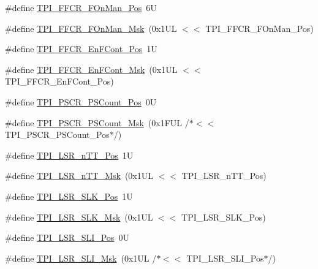 \begin{DoxyCompactItemize}
\item 
\#define \mbox{\hyperlink{group___c_m_s_i_s___t_p_i_gac57b0b588a37a870573560bc6316cbcc}{T\+P\+I\+\_\+\+F\+F\+C\+R\+\_\+\+F\+On\+Man\+\_\+\+Pos}}~6U
\item 
\#define \mbox{\hyperlink{group___c_m_s_i_s___t_p_i_ga7aeb30af62d04e852a55c3bd64c1bd2c}{T\+P\+I\+\_\+\+F\+F\+C\+R\+\_\+\+F\+On\+Man\+\_\+\+Msk}}~(0x1\+U\+L $<$$<$ T\+P\+I\+\_\+\+F\+F\+C\+R\+\_\+\+F\+On\+Man\+\_\+\+Pos)
\item 
\#define \mbox{\hyperlink{group___c_m_s_i_s___t_p_i_ga99e58a0960b275a773b245e2b69b9a64}{T\+P\+I\+\_\+\+F\+F\+C\+R\+\_\+\+En\+F\+Cont\+\_\+\+Pos}}~1U
\item 
\#define \mbox{\hyperlink{group___c_m_s_i_s___t_p_i_ga27d1ecf2e0ff496df03457a2a97cb2c9}{T\+P\+I\+\_\+\+F\+F\+C\+R\+\_\+\+En\+F\+Cont\+\_\+\+Msk}}~(0x1\+U\+L $<$$<$ T\+P\+I\+\_\+\+F\+F\+C\+R\+\_\+\+En\+F\+Cont\+\_\+\+Pos)
\item 
\#define \mbox{\hyperlink{group___c_m_s_i_s___t_p_i_ga4235dcb941b49a9e8c1f7616dc210b38}{T\+P\+I\+\_\+\+P\+S\+C\+R\+\_\+\+P\+S\+Count\+\_\+\+Pos}}~0U
\item 
\#define \mbox{\hyperlink{group___c_m_s_i_s___t_p_i_ga017e1a8b42c9fb4c525d41bafaca9262}{T\+P\+I\+\_\+\+P\+S\+C\+R\+\_\+\+P\+S\+Count\+\_\+\+Msk}}~(0x1\+F\+U\+L /$\ast$$<$$<$ T\+P\+I\+\_\+\+P\+S\+C\+R\+\_\+\+P\+S\+Count\+\_\+\+Pos$\ast$/)
\item 
\#define \mbox{\hyperlink{group___c_m_s_i_s___t_p_i_gaca9783a5531fde10b57fb9817de37790}{T\+P\+I\+\_\+\+L\+S\+R\+\_\+n\+T\+T\+\_\+\+Pos}}~1U
\item 
\#define \mbox{\hyperlink{group___c_m_s_i_s___t_p_i_gaabd6c342674f066772c9d35448a301e1}{T\+P\+I\+\_\+\+L\+S\+R\+\_\+n\+T\+T\+\_\+\+Msk}}~(0x1\+U\+L $<$$<$ T\+P\+I\+\_\+\+L\+S\+R\+\_\+n\+T\+T\+\_\+\+Pos)
\item 
\#define \mbox{\hyperlink{group___c_m_s_i_s___t_p_i_ga641c06d830dac7e2ff9971d95f2432a0}{T\+P\+I\+\_\+\+L\+S\+R\+\_\+\+S\+L\+K\+\_\+\+Pos}}~1U
\item 
\#define \mbox{\hyperlink{group___c_m_s_i_s___t_p_i_gab91c42714b86fe5d2b022fc8e5f3d0e6}{T\+P\+I\+\_\+\+L\+S\+R\+\_\+\+S\+L\+K\+\_\+\+Msk}}~(0x1\+U\+L $<$$<$ T\+P\+I\+\_\+\+L\+S\+R\+\_\+\+S\+L\+K\+\_\+\+Pos)
\item 
\#define \mbox{\hyperlink{group___c_m_s_i_s___t_p_i_ga94c8185149817f81a6ca689f89d8193c}{T\+P\+I\+\_\+\+L\+S\+R\+\_\+\+S\+L\+I\+\_\+\+Pos}}~0U
\item 
\#define \mbox{\hyperlink{group___c_m_s_i_s___t_p_i_gace974ad6e051759bafcfea1b8189c606}{T\+P\+I\+\_\+\+L\+S\+R\+\_\+\+S\+L\+I\+\_\+\+Msk}}~(0x1\+U\+L /$\ast$$<$$<$ T\+P\+I\+\_\+\+L\+S\+R\+\_\+\+S\+L\+I\+\_\+\+Pos$\ast$/)

\end{DoxyCompactItemize}
